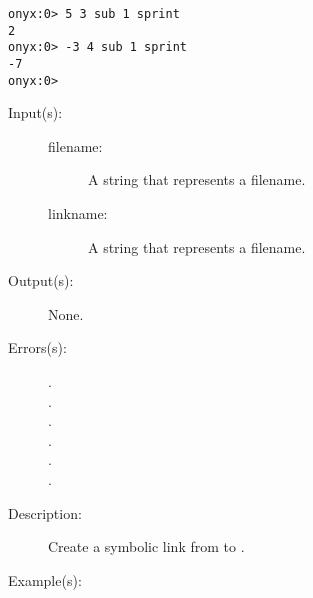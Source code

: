 \begin{description}
\begin{description}
\begin{verbatim}
onyx:0> 5 3 sub 1 sprint
2
onyx:0> -3 4 sub 1 sprint
-7
onyx:0>
		\end{verbatim}
	\end{description}
\label{systemdict:symlink}
\item[{\onyxop{filename linkname}{symlink}{--}}: ]
	\begin{description}\item[]
	\item[Input(s): ]
		\begin{description}\item[]
		\item[filename: ]
			A string that represents a filename.
		\item[linkname: ]
			A string that represents a filename.
		\end{description}
	\item[Output(s): ] None.
	\item[Errors(s): ]
		\begin{description}\item[]
		\item[.]
		\item[.]
		\item[.]
		\item[.]
		\item[.]
		\item[.]
		\end{description}
	\item[Description: ]
		Create a symbolic link from  to
		.
	\item[Example(s): ]\begin{verbatim}


\end{verbatim}
\end{description}
\end{description}
